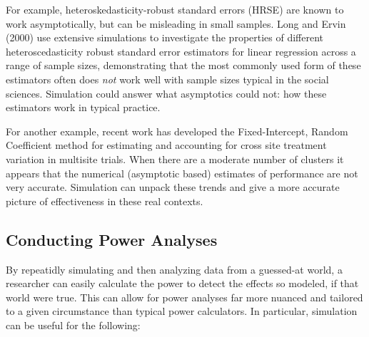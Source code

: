 \documentclass[
]{book}
\begin{document}
For example, heteroskedasticity-robust standard errors (HRSE) are known to work asymptotically, but can be misleading in small samples.
Long and Ervin (2000) use extensive simulations to investigate the properties of different heteroscedasticity robust standard error estimators for linear regression across a range of sample sizes, demonstrating that the most commonly used form of these estimators often does \emph{not} work well with sample sizes typical in the social sciences.
Simulation could answer what asymptotics could not: how these estimators work in typical practice.

For another example, recent work has developed the Fixed-Intercept, Random Coefficient method for estimating and accounting for cross site treatment variation in multisite trials. When there are a moderate number of clusters it appears that the numerical (asymptotic based) estimates of performance are not very accurate. Simulation can unpack these trends and give a more accurate picture of effectiveness in these real contexts.

\hypertarget{conducting-power-analyses}{%
\subsection{Conducting Power Analyses}\label{conducting-power-analyses}}

By repeatidly simulating and then analyzing data from a guessed-at world, a researcher can easily calculate the power to detect the effects so modeled, if that world were true.
This can allow for power analyses far more nuanced and tailored to a given circumstance than typical power calculators. In particular, simulation can be useful for the following:
\end{document}
